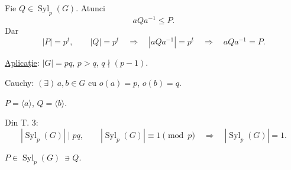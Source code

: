 \medskip
\noindent Fie $Q\in\operatorname{Syl}_p(G)$. Atunci
\[
aQa^{-1}\leq P.
\]
\noindent Dar
\[
|P|=p^t,\qquad |Q|=p^t
\quad\Longrightarrow\quad |aQa^{-1}|=p^t
\quad\Longrightarrow\quad aQa^{-1}=P.
\]

\bigskip
\noindent\underline{Aplicaţie}: $|G|=pq$, $p>q$, $q\nmid(p-1)$.

\medskip
\noindent Cauchy: $(\exists)\,a,b\in G$ cu
$o(a)=p$, $o(b)=q$.

\noindent $P=\langle a\rangle$, $Q=\langle b\rangle$.

\noindent Din T. 3:
\[
|\operatorname{Syl}_p(G)|\mid pq,
\qquad |\operatorname{Syl}_p(G)|\equiv1\pmod p
\quad\Longrightarrow\quad |\operatorname{Syl}_p(G)|=1.
\]

\noindent $P\in\operatorname{Syl}_p(G)\ \ni Q$.%
